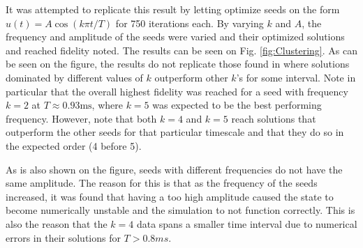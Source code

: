 \documentclass[a4paper, twocolumn]{revtex4-1}
\begin{document}
It was attempted to replicate this result by letting  optimize seeds on the form $u(t) = A\cos(k\pi t/T)$ for 750 iterations each. By varying $k$ and $A$, the frequency and amplitude of the seeds were varied and their optimized solutions and reached fidelity noted. The results can be seen on Fig. \ref{fig:Clustering}. As can be seen on the figure, the results do not replicate those found in \cite{QM2Paper} where solutions dominated by different values of $k$ outperform other $k$'s for some interval. Note in particular that the overall highest fidelity was reached for a seed with frequency $k=2$ at $ T\approx 0.93 \text{ms} $, where $ k=5 $ was expected to be the best performing frequency. However, note that both $k=4$ and $k=5$ reach solutions that outperform the other seeds for that particular timescale and that they do so in the expected order (4 before 5). 

As is also shown on the figure, seeds with different frequencies do not have the same amplitude. The reason for this is that as the frequency of the seeds increased, it was found that having a too high amplitude caused the state to become numerically unstable and the simulation to not function correctly. This is also the reason that the $k=4$ data spans a smaller time interval due to numerical errors in their solutions for $T>0.8 ms$. \\
\end{document}
